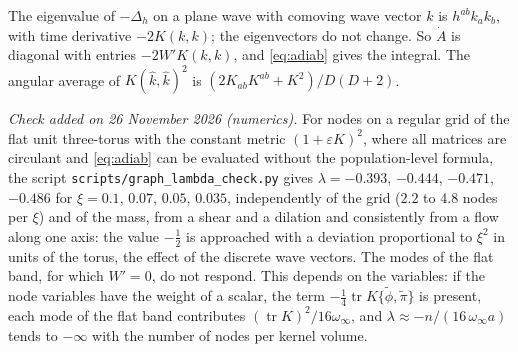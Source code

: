 \documentclass[11pt,a4paper]{article}
\makeatletter
\theoremstyle{stmt}
\theoremstyle{defn}
\theoremstyle{rmk}
\renewenvironment{proof}[1][\proofname]{\par\pushQED{\qed}\normalfont\topsep6\p@\@plus6\p@\relax
  \trivlist\item[\hskip\labelsep{\sffamily\itshape\small #1.}]\ignorespaces}{\popQED\endtrivlist\@endpefalse}
\numberwithin{equation}{section}
\makeatother
\begin{document}
\begin{proof}
The eigenvalue of $-\Delta_h$ on a plane wave with comoving wave vector $k$ is $h^{ab}k_ak_b$, with time derivative $-2K(k,k)$; the eigenvectors do not change. So $\dot A$ is diagonal with entries $-2W'K(k,k)$, and \eqref{eq:adiab} gives the integral. The angular average of $K(\hat k,\hat k)^2$ is $(2K_{ab}K^{ab}+K^2)/D(D+2)$.
\end{proof}

\emph{Check added on 26 November 2026 (numerics).} For nodes on a regular grid of the flat unit three-torus with the constant metric $(1+\varepsilon K)^2$, where all matrices are circulant and \eqref{eq:adiab} can be evaluated without the population-level formula, the script \texttt{scripts/graph\_lambda\_check.py} gives $\lambda=-0.393$, $-0.444$, $-0.471$, $-0.486$ for $\xi=0.1$, $0.07$, $0.05$, $0.035$, independently of the grid ($2.2$ to $4.8$ nodes per $\xi$) and of the mass, from a shear and a dilation and consistently from a flow along one axis: the value $-\tfrac12$ is approached with a deviation proportional to $\xi^2$ in units of the torus, the effect of the discrete wave vectors. The modes of the flat band, for which $W'=0$, do not respond. This depends on the variables: if the node variables have the weight of a scalar, the term $-\tfrac14\operatorname{tr}K\{\tilde\phi,\tilde\pi\}$ is present, each mode of the flat band contributes $(\operatorname{tr}K)^2/16\omega_\infty$, and $\lambda\approx-n/(16\,\omega_\infty a)$ tends to $-\infty$ with the number of nodes per kernel volume.
\end{document}

